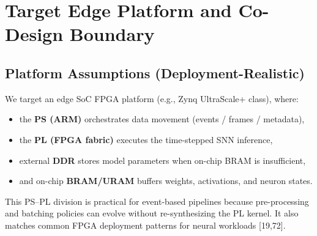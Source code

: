 \documentclass[10pt,journal,compsoc]{IEEEtran}
\begin{document}
\begin{abstract}
This section describes an \textbf{FPGA-faithful deployment and accelerator design} for an event-based SNN detector (baseline: EAS-SNN [1]) under the proposed hardware-aware NAS--pruning--quantization (HAPQ) framework. The goal is not to ``stack FPGA features,'' but to show how \textbf{algorithmic decisions become deterministic hardware structures}. In particular, we revisit the proposal's under-specified part---\textbf{membrane potential quantization}---and make its hardware impact explicit using resource and bandwidth analysis. Related hardware-aware compression principles are consistent with prior platform-aware adaptation and quantization lines [38--41], while SNN-specific acceleration constraints are shaped by spike-driven compute and state update locality [16,19,72].
\end{abstract}

\section{Target Edge Platform and Co-Design Boundary}

\subsection{Platform Assumptions (Deployment-Realistic)}
We target an edge SoC FPGA platform (e.g., Zynq UltraScale+ class), where:
\begin{itemize}
    \item the \textbf{PS (ARM)} orchestrates data movement (events / frames / metadata),
    \item the \textbf{PL (FPGA fabric)} executes the time-stepped SNN inference,
    \item external \textbf{DDR} stores model parameters when on-chip BRAM is insufficient,
    \item and on-chip \textbf{BRAM/URAM} buffers weights, activations, and neuron states.
\end{itemize}
This PS--PL division is practical for event-based pipelines because pre-processing and batching policies can evolve without re-synthesizing the PL kernel. It also matches common FPGA deployment patterns for neural workloads [19,72].
\end{document}
